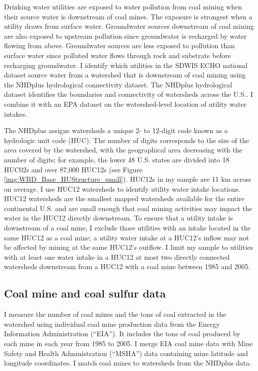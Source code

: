 \documentclass[12pt]{article}
\begin{document}
Drinking water utilities are exposed to water pollution from coal mining when their source water is downstream of coal mines. The exposure is strongest when a utility draws from surface water. Groundwater sources downstream of coal mining are also exposed to upstream pollution since groundwater is recharged by water flowing from above. Groundwater sources are less exposed to pollution than surface water since polluted water flows through rock and substrate before recharging groundwater. I identify which utilities in the SDWIS ECHO national dataset source water from a watershed that is downstream of coal mining using the NHDplus hydrological connectivity dataset. The NHDplus hydrological dataset identifies the boundaries and connectivity of watersheds across the U.S.. I combine it with an EPA dataset on the watershed-level location of utility water intakes. 

The NHDplus assigns watersheds a unique 2- to 12-digit code known as a hydrologic unit code (HUC). The number of digits corresponds to the size of the area covered by the watershed, with the geographical area decreasing with the number of digits; for example, the lower 48 U.S. states are divided into 18 HUC02s and over 87,000 HUC12s (see Figure \ref{img:WBD_Base_HUStructure_small}). HUC12s in my sample are 11 km across on average. I use HUC12 watersheds to identify utility water intake locations. HUC12 watersheds are the smallest mapped watersheds available for the entire continental U.S. and are small enough that coal mining activities may impact the water in the HUC12 directly downstream. To ensure that a utility intake is downstream of a coal mine, I exclude those utilities with an intake located in the same HUC12 as a coal mine; a utility water intake at a HUC12's inflow may not be affected by mining at the same HUC12's outflow. I limit my sample to utilities with at least one water intake in a HUC12 at most two directly connected watersheds downstream from a HUC12 with a coal mine between 1985 and 2005.

\subsection{Coal mine and coal sulfur data}

I measure the number of coal mines and the tons of coal extracted in the watershed using individual coal mine production data from the Energy Information Administration (``EIA''). It includes the tons of coal produced by each mine in each year from 1985 to 2005. I merge EIA coal mine data with Mine Safety and Health Administration (``MSHA'') data containing mine latitude and longitude coordinates. I match coal mines to watersheds from the NHDplus data.
\end{document}
